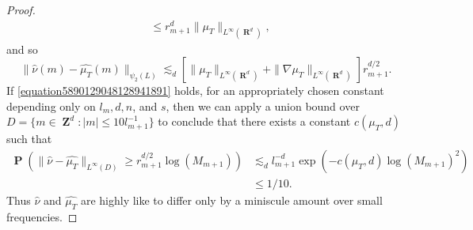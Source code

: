 \documentclass[12pt,reqno]{amsart}
\DeclareMathOperator{\RR}{\mathbf{R}}
\DeclareMathOperator{\ZZ}{\mathbf{Z}}
\DeclareMathOperator{\PP}{\mathbf{P}}
\newcommand{\psitwo}[1]{\| {#1} \|_{\psi_2(L)}}
\begin{document}
\begin{proof}
\begin{align*}
        &\leq r_{m+1}^d \| \mu_T \|_{L^\infty(\RR^d)},
    \end{align*}
    and so
    \begin{equation} \label{equation10491204901290}
        \psitwo{\widehat{\nu}(m) - \widehat{\mu_T}(m)} \lesssim_d [\| \mu_T \|_{L^\infty(\RR^d)} + \| \nabla \mu_T \|_{L^\infty(\RR^d)}] r_{m+1}^{d/2}.
    \end{equation}
    If \eqref{equation5890129048128941891} holds, for an appropriately chosen constant depending only on $l_m, d, n$, and $s$, then we can apply a union bound over $D = \{ m \in \ZZ^d : |m| \leq 10 l_{m+1}^{-1} \}$ to conclude that there exists a constant $c(\mu_T,d)$ such that
    \begin{align*}
        \PP \left(\| \widehat{\nu} - \widehat{\mu_T} \|_{L^\infty(D)} \geq r_{m+1}^{d/2} \log(M_{m+1}) \right) &\lesssim_d l_{m+1}^{-d} \exp \left( - c(\mu_T,d) \log(M_{m+1})^2 \right)\\
        &\leq 1/10.
    \end{align*}
    Thus $\widehat{\nu}$ and $\widehat{\mu_T}$ are highly like to differ only by a miniscule amount over small frequencies.


\end{proof}
\end{document}
